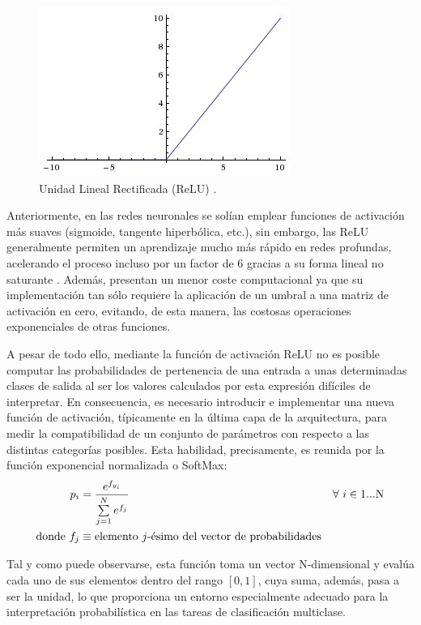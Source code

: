 \begin{figure}
    \centering
    \includegraphics[scale=0.6]{Images/ReLU.png}
    \caption{Unidad Lineal Rectificada (ReLU) \cite{img:ReLU}.}
    \label{fig:ReLU}
\end{figure}

Anteriormente, en las redes neuronales se solían emplear funciones de activación más suaves (sigmoide, tangente hiperbólica, etc.), sin embargo, las ReLU generalmente permiten un aprendizaje mucho más rápido en redes profundas, acelerando el proceso incluso por un factor de 6 gracias a su forma lineal no saturante \cite{Krizhevsky}. Además, presentan un menor coste computacional ya que su implementación tan sólo requiere la aplicación de un umbral a una matriz de activación en cero, evitando, de esta manera, las costosas operaciones exponenciales de otras funciones.

A pesar de todo ello, mediante la función de activación ReLU no es posible computar las probabilidades de pertenencia de una entrada a unas determinadas clases de salida al ser los valores calculados por esta expresión difíciles de interpretar. En consecuencia, es necesario introducir e implementar una nueva función de activación, típicamente en la última capa de la arquitectura, para medir la compatibilidad de un conjunto de parámetros con respecto a las distintas categorías posibles. Esta habilidad, precisamente, es reunida por la función exponencial normalizada o SoftMax:
\begin{align*}
    p_i &= \frac{e^{f_{y_i}}}{\sum\limits_{j=1}^{N} e^{f_j}} & \forall \text{\space} i \in \text{1...N}\\
    \text{donde}~ 
    f_j &\equiv \text{elemento $j$-ésimo del vector de probabilidades}
\end{align*}

Tal y como puede observarse, esta función toma un vector N-dimensional y evalúa cada uno de sus elementos dentro del rango $[0, 1]$, cuya suma, además, pasa a ser la unidad, lo que proporciona un entorno especialmente adecuado para la interpretación probabilística en las tareas de clasificación multiclase.

